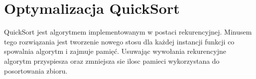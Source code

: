 \section{Optymalizacja QuickSort}
QuickSort jest algorytmem implementowanym w postaci rekurencyjnej. Minusem tego rozwiązania jest tworzenie nowego stosu dla każdej instancji funkcji co spowalnia algorytm i zajmuje pamięć. Usuwając wywołania rekurencyjne algorytm przyspiesza oraz zmniejsza sie ilosc pamieci wykorzystana do posortowania zbioru.
